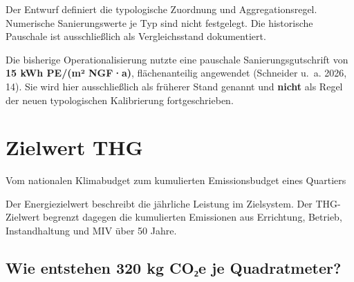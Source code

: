 \documentclass[
  ngerman,
  a4paper,
  DIV=11]{scrreprt}
\begin{document}
\begin{tcolorbox}[enhanced jigsaw, arc=.35mm, bottomrule=.15mm, bottomtitle=1mm, breakable, colback=white, colbacktitle=quarto-callout-note-color!10!white, colframe=quarto-callout-note-color-frame, coltitle=black, left=2mm, leftrule=.75mm, opacityback=0, opacitybacktitle=0.6, rightrule=.15mm, title=\textcolor{quarto-callout-note-color}{\faInfo}\hspace{0.5em}{Parameterstand}, titlerule=0mm, toprule=.15mm, toptitle=1mm]

Der Entwurf definiert die typologische Zuordnung und Aggregationsregel.
Numerische Sanierungswerte je Typ sind nicht festgelegt. Die historische
Pauschale ist ausschließlich als Vergleichsstand dokumentiert.

\end{tcolorbox}

\begin{tcolorbox}[enhanced jigsaw, arc=.35mm, bottomrule=.15mm, bottomtitle=1mm, breakable, colback=white, colbacktitle=quarto-callout-note-color!10!white, colframe=quarto-callout-note-color-frame, coltitle=black, left=2mm, leftrule=.75mm, opacityback=0, opacitybacktitle=0.6, rightrule=.15mm, title=\textcolor{quarto-callout-note-color}{\faInfo}\hspace{0.5em}{Historische Einordnung}, titlerule=0mm, toprule=.15mm, toptitle=1mm]

Die bisherige Operationalisierung nutzte eine pauschale
Sanierungsgutschrift von \textbf{15 kWh PE/(m² NGF·a)}, flächenanteilig
angewendet (Schneider u.~a. 2026, 14). Sie wird hier ausschließlich als
früherer Stand genannt und \textbf{nicht} als Regel der neuen
typologischen Kalibrierung fortgeschrieben.

\end{tcolorbox}

\chapter{Zielwert THG}\label{sec-zielwert-thg}

Vom nationalen Klimabudget zum kumulierten Emissionsbudget eines
Quartiers

Der Energiezielwert beschreibt die jährliche Leistung im Zielsystem. Der
THG-Zielwert begrenzt dagegen die kumulierten Emissionen aus Errichtung,
Betrieb, Instandhaltung und MIV über 50 Jahre.

\section{Wie entstehen 320 kg CO₂e je
Quadratmeter?}\label{wie-entstehen-320-kg-coux2082e-je-quadratmeter}
\end{document}

